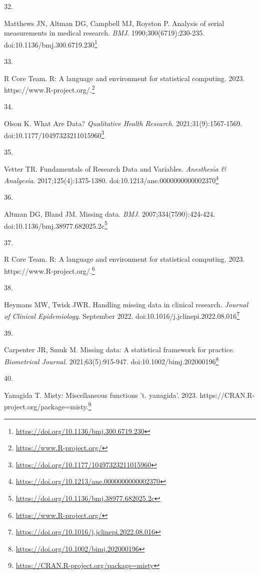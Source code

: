 \documentclass[
  a4paper,
]{book}
\newlength{\cslhangindent}
\newlength{\csllabelwidth}
\newlength{\cslentryspacingunit} %
\newenvironment{CSLReferences}[2] %
 {%
  \setlength{\parindent}{0pt}
  \ifodd #1
  \let\oldpar\par
  \def\par{\hangindent=\cslhangindent\oldpar}
  \fi
  \setlength{\parskip}{#2\cslentryspacingunit}
 }%
 {}
\newcommand{\CSLLeftMargin}[1]{\parbox[t]{\csllabelwidth}{#1}}
\newcommand{\CSLRightInline}[1]{\parbox[t]{\linewidth - \csllabelwidth}{#1}\break}
\renewcommand{\href}[2]{#2\footnote{\url{#1}}}
\begin{document}
\begin{CSLReferences}{0}{0}
\leavevmode{}%
\CSLLeftMargin{32. }%
\CSLRightInline{Matthews JN, Altman DG, Campbell MJ, Royston P. Analysis of serial measurements in medical research. \emph{BMJ}. 1990;300(6719):230-235. doi:\href{https://doi.org/10.1136/bmj.300.6719.230}{10.1136/bmj.300.6719.230}}

\leavevmode{}%
\CSLLeftMargin{33. }%
\CSLRightInline{R Core Team. R: A language and environment for statistical computing. 2023. \href{https://www.R-project.org/}{https://www.R-project.org/.}}

\leavevmode{}%
\CSLLeftMargin{34. }%
\CSLRightInline{Olson K. What Are Data? \emph{Qualitative Health Research}. 2021;31(9):1567-1569. doi:\href{https://doi.org/10.1177/10497323211015960}{10.1177/10497323211015960}}

\leavevmode{}%
\CSLLeftMargin{35. }%
\CSLRightInline{Vetter TR. Fundamentals of Research Data and Variables. \emph{Anesthesia \& Analgesia}. 2017;125(4):1375-1380. doi:\href{https://doi.org/10.1213/ane.0000000000002370}{10.1213/ane.0000000000002370}}

\leavevmode{}%
\CSLLeftMargin{36. }%
\CSLRightInline{Altman DG, Bland JM. Missing data. \emph{BMJ}. 2007;334(7590):424-424. doi:\href{https://doi.org/10.1136/bmj.38977.682025.2c}{10.1136/bmj.38977.682025.2c}}

\leavevmode{}%
\CSLLeftMargin{37. }%
\CSLRightInline{R Core Team. R: A language and environment for statistical computing. 2023. \href{https://www.R-project.org/}{https://www.R-project.org/.}}

\leavevmode{}%
\CSLLeftMargin{38. }%
\CSLRightInline{Heymans MW, Twisk JWR. Handling missing data in clinical research. \emph{Journal of Clinical Epidemiology}. September 2022. doi:\href{https://doi.org/10.1016/j.jclinepi.2022.08.016}{10.1016/j.jclinepi.2022.08.016}}

\leavevmode{}%
\CSLLeftMargin{39. }%
\CSLRightInline{Carpenter JR, Smuk M. Missing data: A statistical framework for practice. \emph{Biometrical Journal}. 2021;63(5):915-947. doi:\href{https://doi.org/10.1002/bimj.202000196}{10.1002/bimj.202000196}}

\leavevmode{}%
\CSLLeftMargin{40. }%
\CSLRightInline{Yanagida T. Misty: Miscellaneous functions 't. yanagida'. 2023. \href{https://CRAN.R-project.org/package=misty}{https://CRAN.R-project.org/package=misty.}}


\end{CSLReferences}
\end{document}
